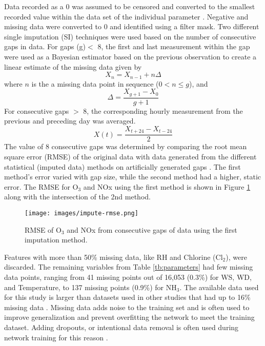 Data recorded as a 0 was assumed to be censored and converted to the smallest recorded value within the data set of the individual parameter \citep{Rana2015}. Negative and missing data were converted to 0 and identified using a filter mask. Two different single imputation (SI) techniques were used based on the number of consecutive gaps in data. For gaps (g)$<$ 8, the first and last measurement within the gap were used as a Bayesian estimator based on the previous observation to create a linear estimate of the missing data given by 
%
\begin{equation}
\label{eq:impute1}
X_{n} = X_{n-1} + n\Delta
\end{equation}
%
\noindent
where $n$ is the a missing data point in sequence ($0 < n \leq g$), and 
%
\begin{equation}
\label{eq:impute2}
\Delta = \frac{X_{g+1} - X_{0}}{g+1}
\end{equation}
%
For consecutive gaps $>$ 8, the corresponding hourly measurement from the previous and preceding day was averaged.
%
\begin{equation}
\label{eq:impute3}
X(t) = \frac{X_{t+24} - X_{t-24}}{2}
\end{equation}
%
The value of 8 consecutive gaps was determined by comparing the root mean square error (RMSE) of the original data with data generated from the different statistical (imputed data) methods on artificially generated gaps \citep{Junninen2004}. The first method's error varied with gap size, while the second method had a higher, static error. The RMSE for O$_{3}$ and NOx using the first method is shown in Figure \ref{fig:impute-rmse} along with the intersection of the 2nd method.
%
\begin{figure}[H]
\centering
\texttt{[image: images/impute-rmse.png]}
\caption{RMSE of O$_{3}$ and NOx from consecutive gaps of data using the first imputation method.}
\label{fig:impute-rmse}
\end{figure}
%
Features with more than 50\% missing data, like RH and Chlorine (Cl$_{2}$), were discarded. The remaining variables from Table \ref{tb:parameters} had few missing data points, ranging from 41 missing points out of 16,053 (0.3\%) for WS, WD, and Temperature, to 137 missing points (0.9\%) for NH$_{3}$. The available data used for this study is larger than datasets used in other studies that had up to 16\% missing data \citep{Taspinar2015}. Missing data adds noise to the training set and is often used to improve generalization and prevent overfitting the network to meet the training dataset. Adding dropouts, or intentional data removal is often used during network training for this reason \citep{Srivastava2014}.

